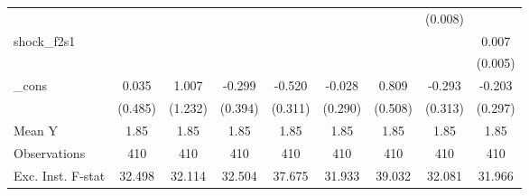{\begin{tabular}{l*{8}{c}}
            &                     &                     &                     &                     &                     &                     &     (0.008)         &                     \\
\addlinespace
shock\_f2s1  &                     &                     &                     &                     &                     &                     &                     &       0.007         \\
            &                     &                     &                     &                     &                     &                     &                     &     (0.005)         \\
\addlinespace
\_cons      &       0.035         &       1.007         &      -0.299         &      -0.520         &      -0.028         &       0.809         &      -0.293         &      -0.203         \\
            &     (0.485)         &     (1.232)         &     (0.394)         &     (0.311)         &     (0.290)         &     (0.508)         &     (0.313)         &     (0.297)         \\
\midrule
Mean Y      &        1.85         &        1.85         &        1.85         &        1.85         &        1.85         &        1.85         &        1.85         &        1.85         \\
Observations&         410         &         410         &         410         &         410         &         410         &         410         &         410         &         410         \\
Exc. Inst. F-stat&      32.498         &      32.114         &      32.504         &      37.675         &      31.933         &      39.032         &      32.081         &      31.966         \\
\bottomrule
\end{tabular}
}

